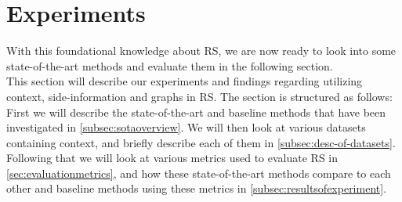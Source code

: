 \section{Experiments}\label{sec:experiments}
With this foundational knowledge about RS, we are now ready to look into some state-of-the-art methods and evaluate them in the following section.\\ 
This section will describe our experiments and findings regarding utilizing context, side-information and graphs in RS.
The section is structured as follows: First we will describe the state-of-the-art and baseline methods that have been investigated in \cref{subsec:sotaoverview}.
We will then look at various datasets containing context, and briefly describe each of them in \cref{subsec:desc-of-datasets}.
Following that we will look at various metrics used to evaluate RS in \cref{sec:evaluationmetrics}, and how these state-of-the-art methods compare to each other and baseline methods using these metrics in \cref{subsec:resultsofexperiment}.





